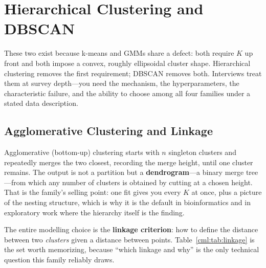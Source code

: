 \section{Hierarchical Clustering and DBSCAN}
\label{cml:sec:hier_dbscan}

These two exist because k-means and GMMs share a defect: both require $K$ up front and both impose a convex, roughly ellipsoidal cluster shape. Hierarchical clustering removes the first requirement; DBSCAN removes both. Interviews treat them at survey depth---you need the mechanism, the hyperparameters, the characteristic failure, and the ability to choose among all four families under a stated data description.

\subsection{Agglomerative Clustering and Linkage}

Agglomerative (bottom-up) clustering starts with $n$ singleton clusters and repeatedly merges the two closest, recording the merge height, until one cluster remains. The output is not a partition but a \textbf{dendrogram}---a binary merge tree---from which any number of clusters is obtained by cutting at a chosen height. That is the family's selling point: one fit gives you every $K$ at once, plus a picture of the nesting structure, which is why it is the default in bioinformatics and in exploratory work where the hierarchy itself is the finding.

The entire modelling choice is the \textbf{linkage criterion}: how to define the distance between two \emph{clusters} given a distance between points. Table~\ref{cml:tab:linkage} is the set worth memorizing, because ``which linkage and why'' is the only technical question this family reliably draws.

